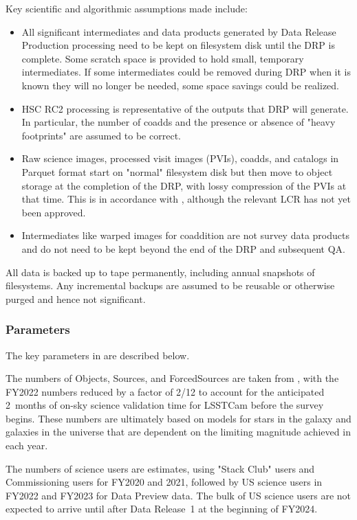 Key scientific and algorithmic assumptions made include:
\begin{itemize}
\item All significant intermediates and data products generated by Data Release Production processing need to be kept on filesystem disk until the DRP is complete.
Some scratch space is provided to hold small, temporary intermediates.
If some intermediates could be removed during DRP when it is known they will no longer be needed, some space savings could be realized.
\item HSC RC2 processing is representative of the outputs that DRP will generate.
In particular, the number of coadds and the presence or absence of "heavy footprints" are assumed to be correct.
\item Raw science images, processed visit images (PVIs), coadds, and catalogs in Parquet format start on "normal" filesystem disk but then move to object storage at the completion of the DRP, with lossy compression of the PVIs at that time.
This is in accordance with , although the relevant LCR has not yet been approved.
\item Intermediates like warped images for coaddition are not survey data products and do not need to be kept beyond the end of the DRP and subsequent QA.
\end{itemize}

All data is backed up to tape permanently, including annual snapshots of filesystems.
Any incremental backups are assumed to be reusable or otherwise purged and hence not significant.

\subsubsection{Parameters}

The key parameters in  are described below.

The numbers of Objects, Sources, and ForcedSources are taken from , with the FY2022 numbers reduced by a factor of 2/12 to account for the anticipated 2~months of on-sky science validation time for LSSTCam before the survey begins.
These numbers are ultimately based on models for stars in the galaxy and galaxies in the universe that are dependent on the limiting magnitude achieved in each year.

The numbers of science users are estimates, using "Stack Club" users and Commissioning users for FY2020 and 2021, followed by US science users in FY2022 and FY2023 for Data Preview data.
The bulk of US science users are not expected to arrive until after Data Release~1 at the beginning of FY2024.

